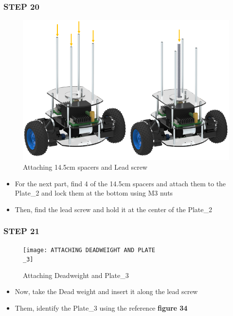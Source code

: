\documentclass[12pt,a4paper,oneside]{book}
\begin{document}
			\subsubsection*{STEP 20}
				\begin{figure}[H]
					\begin{center}
						\includegraphics[scale=0.8]{ATTACHING 14.5CM SPACERS AND LEADSCREW}
						\caption{Attaching 14.5cm spacers and Lead screw}
					\end{center}
				\end{figure}
				\begin{itemize}
					\item For the next part, find 4 of the 14.5cm spacers and attach them to the Plate\_2 and lock them at the bottom using M3 nuts
					\item Then, find the lead screw and hold it at the center of the Plate\_2
				\end{itemize}
				
			\subsubsection*{STEP 21}
				\begin{figure}[H]
					\begin{center}
						\texttt{[image: ATTACHING DEADWEIGHT AND PLATE\\\_3]}
						\caption{Attaching Deadweight and Plate\_3}
					\end{center}
				\end{figure}
				\begin{itemize}
					\item Now, take the Dead weight and insert it along the lead screw
					\item Them, identify the Plate\_3 using the reference \textbf{figure 34}
				\end{itemize}
				
\end{document}
